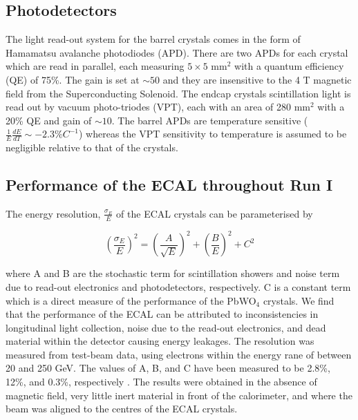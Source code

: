 \subsection{Photodetectors} \label{subsec-Photodetectors}

The light read-out system for the barrel crystals comes in the form of Hamamatsu avalanche photodiodes (APD). There are two APDs for each crystal which are read in parallel, each measuring $5\times5$ mm$^2$ with a quantum efficiency (QE) of 75\%. The gain is set at $\sim50$ and they are insensitive to the 4 T magnetic field from the Superconducting Solenoid. The endcap crystals scintillation light is read out by vacuum photo-triodes (VPT), each with an area of 280 mm$^2$ with a 20\% QE and gain of $\sim10$. The barrel APDs are temperature sensitive ($\frac{1}{E}\frac{dE}{dT}\sim-2.3\%C^{-1}$) whereas the VPT sensitivity to temperature is assumed to be negligible relative to that of the crystals.  

\subsection{Performance of the ECAL throughout Run I} \label{subsec-ECALPerformance}

The energy resolution, $\frac{\sigma_E}{E}$ of the ECAL crystals can be parameterised by

\begin{equation} \label{eqn-ECALenergyresolution}
\left(\frac{\sigma_E}{E}\right)^2 = \left(\frac{A}{\sqrt{E}}\right)^2 + \left(\frac{B}{E}\right)^2 + C^2
\end{equation}

where A and B are the stochastic term for scintillation showers and noise term due to read-out electronics and photodetectors, respectively. C is a constant term which is a direct measure of the performance of the PbWO$_4$ crystals. We find that the performance of the ECAL can be attributed to inconsistencies in longitudinal light collection, noise due to the read-out electronics, and dead material within the detector causing energy leakages. The resolution was measured from test-beam data, using electrons within the energy rane of between 20 and 250 GeV. The values of A, B, and C have been measured to be 2.8\%, 12\%, and 0.3\%, respectively \cite{CMSexperiment}. The results were obtained in the absence of magnetic field, very little inert material in front of the calorimeter, and where the beam was aligned to the centres of the ECAL crystals. 


